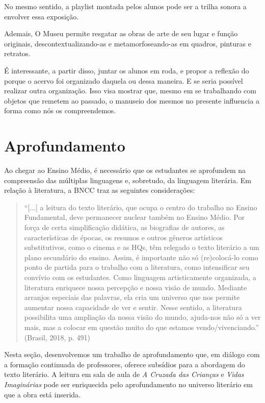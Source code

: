 \documentclass[12pt]{extarticle}
\begin{document}
No mesmo sentido, a playlist montada pelos alunos pode ser a trilha
sonora a envolver essa exposição.

Ademais, O Museu permite resgatar as obras de arte de seu lugar e função
originais, descontextualizando-as e metamorfoseando-as em quadros,
pinturas e retratos.

É interessante, a partir disso, juntar os alunos em roda, e propor a
reflexão do porque o acervo foi organizado daquela ou dessa maneira. E
se seria possível realizar outra organização. Isso visa mostrar que,
mesmo em se trabalhando com objetos que remetem ao passado, o manuseio
dos mesmos no presente influencia a forma como nós os compreendemos.



\section{Aprofundamento}

Ao chegar ao Ensino Médio, é necessário que os estudantes se aprofundem
na compreensão das múltiplas linguagens e, sobretudo, da linguagem
literária. Em relação à literatura, a BNCC traz as seguintes
considerações:

\begin{quote}
``{[}...{]} a leitura do texto literário, que ocupa o centro do trabalho
no Ensino Fundamental, deve permanecer nuclear também no Ensino Médio.
Por força de certa simplificação didática, as biografias de autores, as
características de épocas, os resumos e outros gêneros artísticos
substitutivos, como o cinema e as HQs, têm relegado o texto literário a
um plano secundário do ensino. Assim, é importante não só (re)colocá-lo
como ponto de partida para o trabalho com a literatura, como
intensificar seu convívio com os estudantes. Como linguagem
artisticamente organizada, a literatura enriquece nossa percepção e
nossa visão de mundo. Mediante arranjos especiais das palavras, ela cria
um universo que nos permite aumentar nossa capacidade de ver e sentir.
Nesse sentido, a literatura possibilita uma ampliação da nossa visão do
mundo, ajuda-nos não só a ver mais, mas a colocar em questão muito do
que estamos vendo/vivenciando.'' (Brasil, 2018, p. 491)
\end{quote}

Nesta seção, desenvolvemos um trabalho de aprofundamento que, em diálogo
com a formação continuada de professores, oferece subsídios para a
abordagem do texto literário. A leitura em sala de aula de \emph{A
Cruzada das Crianças} e \emph{Vidas Imaginárias} pode ser enriquecida
pelo aprofundamento no universo literário em que a obra está inserida.
\end{document}
